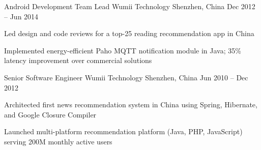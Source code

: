 \begin{cventries}
  \cventry
    {Android Development Team Lead} %
    {Wumii Technology} %
    {Shenzhen, China} %
    {Dec 2012 -- Jun 2014} %
    {
      \begin{cvitems} %
        \item {Led design and code reviews for a top-25 reading recommendation app in China}
        \item {Implemented energy-efficient Paho MQTT notification module in Java; 35\% latency improvement over commercial solutions}
      \end{cvitems}
    }

  \cventry
    {Senior Software Engineer}
    {Wumii Technology} %
    {Shenzhen, China} %
    {Jun 2010 -- Dec 2012} %
    {
      \begin{cvitems} %
        \item {Architected first news recommendation system in China using Spring, Hibernate, and Google Closure Compiler}
        \item {Launched multi-platform recommendation platform (Java, PHP, JavaScript) serving 200M monthly active users}
      \end{cvitems}
    }

\end{cventries}
